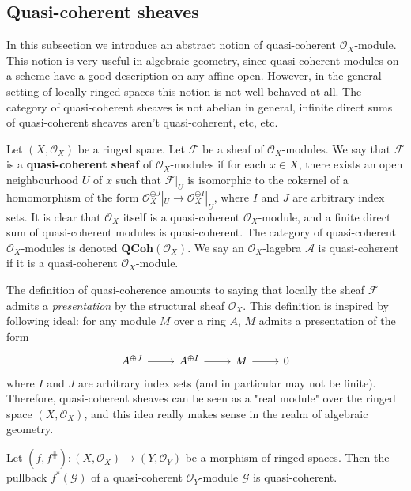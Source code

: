 \subsection{Quasi-coherent sheaves}
In this subsection we introduce an abstract notion of quasi-coherent $\mathscr{O}_X$-module. This notion is very useful in algebraic geometry, since quasi-coherent modules on a scheme have a good description on any affine open. However, in the general setting of locally ringed spaces this notion is not well behaved at all. The category of quasi-coherent sheaves is not abelian in general, infinite direct sums of quasi-coherent sheaves aren't quasi-coherent, etc, etc.\par
Let $(X,\mathscr{O}_X)$ be a ringed space. Let $\mathscr{F}$ be a sheaf of $\mathscr{O}_X$-modules. We say that $\mathscr{F}$ is a \textbf{quasi-coherent sheaf} of $\mathscr{O}_X$-modules if for each $x\in X$, there exists an open neighbourhood $U$ of $x$ such that $\mathscr{F}|_U$ is isomorphic to the cokernel of a homomorphism of the form $\mathscr{O}_X^{\oplus J}|_U\to\mathscr{O}_X^{\oplus I}|_U$, where $I$ and $J$ are arbitrary index sets. It is clear that $\mathscr{O}_X$ itself is a quasi-coherent $\mathscr{O}_X$-module, and a finite direct sum of quasi-coherent modules is quasi-coherent. The category of quasi-coherent $\mathscr{O}_X$-modules is denoted $\mathbf{QCoh}(\mathscr{O}_X)$. We say an $\mathscr{O}_X$-lagebra $\mathscr{A}$ is quasi-coherent if it is a quasi-coherent $\mathscr{O}_X$-module.\par
The definition of quasi-coherence amounts to saying that locally the sheaf $\mathscr{F}$ admits a \textit{presentation} by the structural sheaf $\mathscr{O}_X$. This definition is inspired by following ideal: for any module $M$ over a ring $A$, $M$ admits a presentation of the form
\[\begin{tikzcd}
A^{\oplus J}\ar[r]&A^{\oplus I}\ar[r]&M\ar[r]&0
\end{tikzcd}\]
where $I$ and $J$ are arbitrary index sets (and in particular may not be finite). Therefore, quasi-coherent sheaves can be seen as a "real module" over the ringed space $(X,\mathscr{O}_X)$, and this idea really makes sense in the realm of algebraic geometry.
\begin{proposition}\label{sheaf of module qcoh under inverse image}
Let $(f,f^{\hash}):(X,\mathscr{O}_X)\to(Y,\mathscr{O}_Y)$ be a morphism of ringed spaces. Then the pullback $f^*(\mathscr{G})$ of a quasi-coherent $\mathscr{O}_Y$-module $\mathscr{G}$ is quasi-coherent.
\end{proposition}
